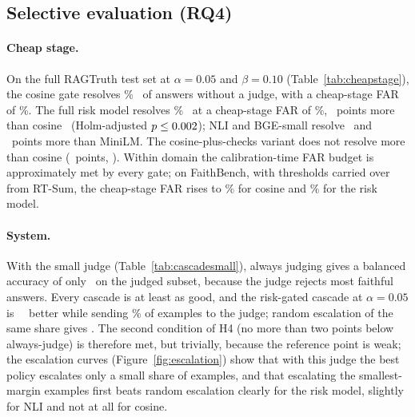 \subsection{Selective evaluation (RQ4)}
\label{sec:res-cascade}

\paragraph{Cheap stage.} On the full RAGTruth test set at $\alpha=0.05$ and $\beta=0.10$ (Table~\ref{tab:cheapstage}), the cosine gate resolves \CsCosFiveCov\% \CsCosFiveCovCi\ of answers without a judge, with a cheap-stage FAR of \CsCosFiveFar\%. The full risk model resolves \CsRiskFiveCov\% \CsRiskFiveCovCi\ at a cheap-stage FAR of \CsRiskFiveFar\%, \HfourRiskDiff\ points more than cosine \HfourRiskDiffCi\ (Holm-adjusted $p\le 0.002$); NLI and BGE-small resolve \HfourNliDiff\ and \HfourBgeDiff\ points more than MiniLM. The cosine-plus-checks variant does not resolve more than cosine (\HfourRiskChkDiff\ points, \HfourRiskChkDiffCi). Within domain the calibration-time FAR budget is approximately met by every gate; on FaithBench, with thresholds carried over from RT-Sum, the cheap-stage FAR rises to \FbOodCosFar\% for cosine and \FbOodRiskFar\% for the risk model.

\begin{table}[t]
\centering\small
\resizebox{\textwidth}{!}{}
\caption{System results on the RAGTruth and FaithBench judged subset ($n=\SysSmallN$) with the small judge. ``Judged'' is the share escalated; ``Random'' is the mean balanced accuracy when the same number of randomly chosen examples is escalated and the rest decided by the gate's $\tau^\mathrm{bal}$.}
\label{tab:cascadesmall}
\end{table}

\paragraph{System.} With the small judge (Table~\ref{tab:cascadesmall}), always judging gives a balanced accuracy of only \SysSmallJudgeBacc\ on the judged subset, because the judge rejects most faithful answers. Every cascade is at least as good, and the risk-gated cascade at $\alpha=0.05$ is \SysSmallRiskFiveDiff\ \SysSmallRiskFiveDiffCi\ better while sending \SysSmallRiskFiveEsc\% of examples to the judge; random escalation of the same share gives \SysSmallRiskFiveRand. The second condition of H4 (no more than two points below always-judge) is therefore met, but trivially, because the reference point is weak; the escalation curves (Figure~\ref{fig:escalation}) show that with this judge the best policy escalates only a small share of examples, and that escalating the smallest-margin examples first beats random escalation clearly for the risk model, slightly for NLI and not at all for cosine.

